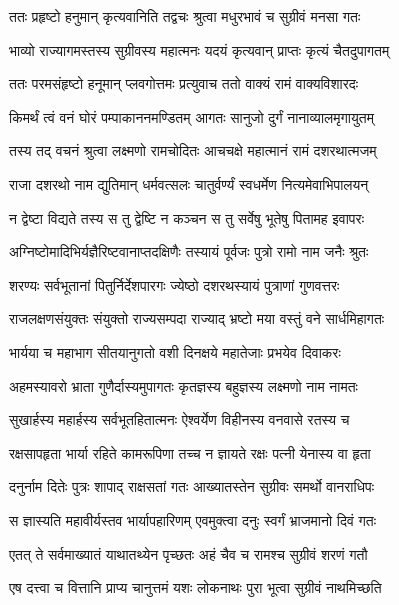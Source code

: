 
\twolineshloka
{ततः प्रहृष्टो हनुमान् कृत्यवानिति तद्वचः}
{श्रुत्वा मधुरभावं च सुग्रीवं मनसा गतः} %

\twolineshloka
{भाव्यो राज्यागमस्तस्य सुग्रीवस्य महात्मनः}
{यदयं कृत्यवान् प्राप्तः कृत्यं चैतदुपागतम्} %

\twolineshloka
{ततः परमसंहृष्टो हनूमान् प्लवगोत्तमः}
{प्रत्युवाच ततो वाक्यं रामं वाक्यविशारदः} %

\twolineshloka
{किमर्थं त्वं वनं घोरं पम्पाकाननमण्डितम्}
{आगतः सानुजो दुर्गं नानाव्यालमृगायुतम्} %

\twolineshloka
{तस्य तद् वचनं श्रुत्वा लक्ष्मणो रामचोदितः}
{आचचक्षे महात्मानं रामं दशरथात्मजम्} %

\twolineshloka
{राजा दशरथो नाम द्युतिमान् धर्मवत्सलः}
{चातुर्वर्ण्यं स्वधर्मेण नित्यमेवाभिपालयन्} %

\twolineshloka
{न द्वेष्टा विद्यते तस्य स तु द्वेष्टि न कञ्चन}
{स तु सर्वेषु भूतेषु पितामह इवापरः} %

\twolineshloka
{अग्निष्टोमादिभिर्यज्ञैरिष्टवानाप्तदक्षिणैः}
{तस्यायं पूर्वजः पुत्रो रामो नाम जनैः श्रुतः} %

\twolineshloka
{शरण्यः सर्वभूतानां पितुर्निर्देशपारगः}
{ज्येष्ठो दशरथस्यायं पुत्राणां गुणवत्तरः} %

\twolineshloka
{राजलक्षणसंयुक्तः संयुक्तो राज्यसम्पदा}
{राज्याद् भ्रष्टो मया वस्तुं वने सार्धमिहागतः} %

\twolineshloka
{भार्यया च महाभाग सीतयानुगतो वशी}
{दिनक्षये महातेजाः प्रभयेव दिवाकरः} %

\twolineshloka
{अहमस्यावरो भ्राता गुणैर्दास्यमुपागतः}
{कृतज्ञस्य बहुज्ञस्य लक्ष्मणो नाम नामतः} %

\twolineshloka
{सुखार्हस्य महार्हस्य सर्वभूतहितात्मनः}
{ऐश्वर्येण विहीनस्य वनवासे रतस्य च} %

\twolineshloka
{रक्षसापहृता भार्या रहिते कामरूपिणा}
{तच्च न ज्ञायते रक्षः पत्नी येनास्य वा हृता} %

\twolineshloka
{दनुर्नाम दितेः पुत्रः शापाद् राक्षसतां गतः}
{आख्यातस्तेन सुग्रीवः समर्थो वानराधिपः} %

\twolineshloka
{स ज्ञास्यति महावीर्यस्तव भार्यापहारिणम्}
{एवमुक्त्वा दनुः स्वर्गं भ्राजमानो दिवं गतः} %

\twolineshloka
{एतत् ते सर्वमाख्यातं याथातथ्येन पृच्छतः}
{अहं चैव च रामश्च सुग्रीवं शरणं गतौ} %

\twolineshloka
{एष दत्त्वा च वित्तानि प्राप्य चानुत्तमं यशः}
{लोकनाथः पुरा भूत्वा सुग्रीवं नाथमिच्छति} %

